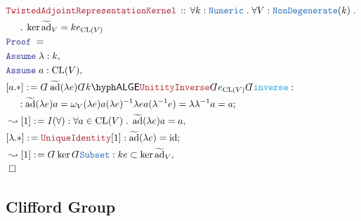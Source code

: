 \documentclass[12pt]{scrartcl}%
\newcommand{\TYPE}[1]{\textcolor{NavyBlue}{\mathtt{#1}}}%
\newcommand{\FUNC}[1]{\textcolor{Cerulean}{\mathtt{#1}}}%
\newcommand{\LOGIC}[1]{\textcolor{Blue}{\mathtt{#1}}}%
\newcommand{\THM}[1]{\textcolor{Maroon}{\mathtt{#1}}}%
\renewcommand{\.}{\; . \;} %
\newcommand{\de}{: \kern 0.1pc =} %
\newcommand{\Theorem}[2]{& \THM{#1} \, :: \, #2 \\ & \Proof = \\ } %
\newcommand{\NewLine}{\\ & \kern 1pc}%
\newcommand{\Page}[1]{ \begin{align*} #1 \end{align*}  }%
\newcommand{ \bd }{ \ByDef }%
\DeclareMathOperator*{\id}{id}%
\newcommand{\Conclude}[3]{& #1 \de #2 : #3; \\}%
\newcommand{\Derive}[3]{& \leadsto #1 \de #2 : #3, \\} %
\newcommand{\Assume}[2]{& \LOGIC{Assume} \; #1 : #2, \\} %
\newcommand{\QED}{\; \square} %
\newcommand{\EndProof}{& \QED \\} %
\newcommand{\ByDef}{\rotatebox[origin=c]{-180}{$D$}}%
\newcommand{\Proof}{\LOGIC{Proof} \; } %
\newcommand{\LALGE}[1]{#1\hyph\mathsf{ALGE}}%
\DeclareMathOperator{\CL}{CL}%
\DeclareMathOperator{\tad}{\widetilde{ad}}%
\begin{document}
\Page{
	\Theorem{TwistedAdjointRepresentationKernel}
	{
		\forall k : \TYPE{Numeric} \.
		\forall V : \TYPE{NonDegenerate}(k) \. \NewLine \.
		\ker  {\tad}_V = k e_{\CL(V)}
	}
	\Assume{\lambda}{k}
	\Assume{a}{\CL(V)}
	\Conclude{[a.*]}{
		\bd \tad(\lambda e)
		\bd \LALGE{k}
		\THM{UnitityInverse}
		\bd e_{\CL(V)}
		\bd \FUNC{inverse}
	}   
	{ \NewLine :
		\tad(\lambda e) a =
		\omega_V(\lambda e) a (\lambda e)^{-1} 
		\lambda e  a (\lambda^{-1} e) =
		\lambda \lambda^{-1} a =
		a
	}
	\Derive{[1]}{I(\forall)}{\forall a \in \CL(V) \. \tad(\lambda e) a = a  }
	\Conclude{[\lambda.*]}{\THM{UniqueIdentity}[1]}{\tad(\lambda e) = \id}
	\Derive{[1]}{\bd \ker\bd \TYPE{Subset}}{ ke \subset \ker {\tad}_V}
	\EndProof
}
\newpage
\subsection{Clifford Group}
\end{document}
